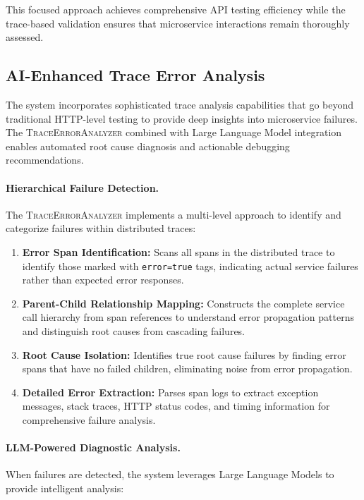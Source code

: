 \documentclass[conference]{IEEEtran}
\begin{document}
This focused approach achieves comprehensive API testing efficiency while the trace-based validation ensures that microservice interactions remain thoroughly assessed.


\subsection{AI-Enhanced Trace Error Analysis}\label{ssec:trace-analysis}

The system incorporates sophisticated trace analysis capabilities that go beyond traditional HTTP-level testing to provide deep insights into microservice failures. The \textsc{TraceErrorAnalyzer} combined with Large Language Model integration enables automated root cause diagnosis and actionable debugging recommendations.

\paragraph{Hierarchical Failure Detection.}
The \textsc{TraceErrorAnalyzer} implements a multi-level approach to identify and categorize failures within distributed traces:

\begin{enumerate}[leftmargin=*]
\item \textbf{Error Span Identification:} Scans all spans in the distributed trace to identify those marked with \texttt{error=true} tags, indicating actual service failures rather than expected error responses.
\item \textbf{Parent-Child Relationship Mapping:} Constructs the complete service call hierarchy from span references to understand error propagation patterns and distinguish root causes from cascading failures.
\item \textbf{Root Cause Isolation:} Identifies true root cause failures by finding error spans that have no failed children, eliminating noise from error propagation.
\item \textbf{Detailed Error Extraction:} Parses span logs to extract exception messages, stack traces, HTTP status codes, and timing information for comprehensive failure analysis.
\end{enumerate}

\paragraph{LLM-Powered Diagnostic Analysis.}
When failures are detected, the system leverages Large Language Models to provide intelligent analysis:
\end{document}
